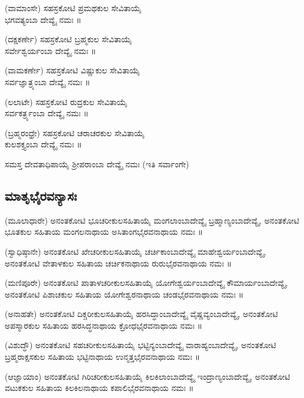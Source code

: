 (ವಾಮಾಂಸೇ) ಸಹಸ್ರಕೋಟಿ ಪ್ರಮಥಕುಲ ಸೇವಿತಾಯೈ\\ ಭಗವತ್ಯಂಬಾ ದೇವ್ಯೈ ನಮಃ ॥

(ದಕ್ಷಕರ್ಣೇ) ಸಹಸ್ರಕೋಟಿ ಬ್ರಹ್ಮಕುಲ ಸೇವಿತಾಯೈ\\ ಸರ್ವೇಶ್ವರ್ಯಂಬಾ ದೇವ್ಯೈ ನಮಃ ॥

(ವಾಮಕರ್ಣೇ) ಸಹಸ್ರಕೋಟಿ ವಿಷ್ಣುಕುಲ ಸೇವಿತಾಯೈ\\ ಸರ್ವಜ್ಞಾತ್ರ್ಯಂಬಾ ದೇವ್ಯೈ ನಮಃ ॥

(ಲಲಾಟೇ) ಸಹಸ್ರಕೋಟಿ ರುದ್ರಕುಲ ಸೇವಿತಾಯೈ\\ ಸರ್ವಕರ್ತ್ರ್ಯಂಬಾ ದೇವ್ಯೈ ನಮಃ ॥

(ಬ್ರಹ್ಮರಂಧ್ರೇ) ಸಹಸ್ರಕೋಟಿ ಚರಾಚರಕುಲ ಸೇವಿತಾಯೈ\\ ಕುಲಶಕ್ತ್ಯಂಬಾ ದೇವ್ಯೈ ನಮಃ ॥

  ಸಮಸ್ತ ದೇವತಾಧಿಪಾಯೈ  ಶ್ರೀಪರಾಂಬಾ ದೇವ್ಯೈ ನಮಃ  (ಇತಿ ಸರ್ವಾಂಗೇ)
\subsection{ಮಾತೃಭೈರವನ್ಯಾಸಃ}
(ಮೂಲಾಧಾರೇ) ಅನಂತಕೋಟಿ ಭೂಚರೀಕುಲಸಹಿತಾಯೈ  ಮಂಗಲಾಂಬಾದೇವ್ಯೈ  ಬ್ರಹ್ಮಾಣ್ಯಂಬಾದೇವ್ಯೈ, ಅನಂತಕೋಟಿ ಭೂತಕುಲ ಸಹಿತಾಯ  ಮಂಗಲನಾಥಾಯ  ಅಸಿತಾಂಗಭೈರವನಾಥಾಯ ನಮಃ ॥

(ಸ್ವಾಧಿಷ್ಠಾನೇ) ಅನಂತಕೋಟಿ ಖೇಚರೀಕುಲಸಹಿತಾಯೈ  ಚರ್ಚಿಕಾಂಬಾದೇವ್ಯೈ  ಮಾಹೇಶ್ವರ್ಯಂಬಾದೇವ್ಯೈ, ಅನಂತಕೋಟಿ ವೇತಾಳಕುಲ ಸಹಿತಾಯ  ಚರ್ಚಿಕನಾಥಾಯ  ರುರುಭೈರವನಾಥಾಯ ನಮಃ ॥

(ಮಣಿಪೂರೇ) ಅನಂತಕೋಟಿ ಪಾತಾಳಚರೀಕುಲಸಹಿತಾಯೈ  ಯೋಗೇಶ್ವರ್ಯಂಬಾದೇವ್ಯೈ  ಕೌಮಾರ್ಯಂಬಾದೇವ್ಯೈ, ಅನಂತಕೋಟಿ ಪಿಶಾಚಕುಲ ಸಹಿತಾಯ  ಯೋಗೇಶ್ವರನಾಥಾಯ  ಚಂಡಭೈರವನಾಥಾಯ ನಮಃ ॥

(ಅನಾಹತೇ) ಅನಂತಕೋಟಿ ದಿಕ್ಚರೀಕುಲಸಹಿತಾಯೈ  ಹರಸಿದ್ಧಾಂಬಾದೇವ್ಯೈ  ವೈಷ್ಣವ್ಯಂಬಾದೇವ್ಯೈ, ಅನಂತಕೋಟಿ ಅಪಸ್ಮಾರಕುಲ ಸಹಿತಾಯ  ಹರಸಿದ್ಧನಾಥಾಯ  ಕ್ರೋಧಭೈರವನಾಥಾಯ ನಮಃ ॥

(ವಿಶುದ್ಧೌ) ಅನಂತಕೋಟಿ ಸಹಚರೀಕುಲಸಹಿತಾಯೈ  ಭಟ್ಟಿನ್ಯಂಬಾದೇವ್ಯೈ  ವಾರಾಹ್ಯಂಬಾದೇವ್ಯೈ, ಅನಂತಕೋಟಿ ಬ್ರಹ್ಮರಾಕ್ಷಸಕುಲ ಸಹಿತಾಯ  ಭಟ್ಟಿನಾಥಾಯ  ಉನ್ಮತ್ತಭೈರವನಾಥಾಯ ನಮಃ ॥

(ಆಜ್ಞಾಯಾಂ) ಅನಂತಕೋಟಿ ಗಿರಿಚರೀಕುಲಸಹಿತಾಯೈ  ಕಿಲಕಿಲಾಂಬಾದೇವ್ಯೈ  ಇಂದ್ರಾಣ್ಯಂಬಾದೇವ್ಯೈ, ಅನಂತಕೋಟಿ ವಟುಕಕುಲ ಸಹಿತಾಯ  ಕಿಲಕಿಲನಾಥಾಯ  ಕಪಾಲಿಭೈರವನಾಥಾಯ ನಮಃ ॥

